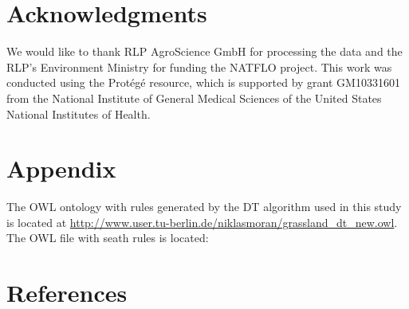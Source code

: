 \documentclass[authoryear, review,12pt,number]{elsarticle}
\begin{document}
\section{Acknowledgments}
We would like to thank RLP AgroScience GmbH for processing the data and the
RLP's Environment Ministry for funding the NATFLO project. This work was
conducted using the Prot\'eg\'e resource, which is supported by grant GM10331601
from the National Institute of General Medical Sciences of the United States
National
Institutes of Health.
\section{Appendix}

The OWL ontology with rules generated by the DT algorithm used in this study 
is located at 
\url{http://www.user.tu-berlin.de/niklasmoran/grassland_dt_new.owl}. The OWL 
file with seath rules is located: 


\section{References}  
\end{document}
